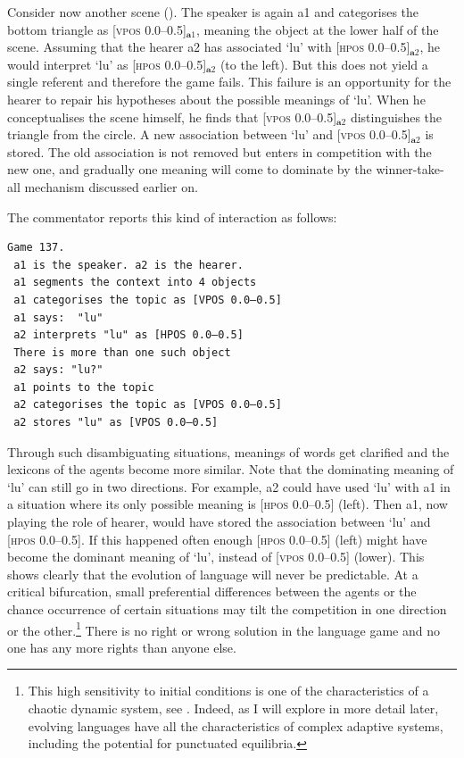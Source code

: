 Consider now another scene (). The speaker
is again {\bfshape a1} and categorises the bottom triangle as 
[\textsc{vpos} 0.0–0.5]$_{\mathbf  a1}$, meaning
the object at the lower half of the scene. Assuming that the
hearer {\bfshape a2} has associated `lu' with [\textsc{hpos} 0.0–0.5]$_{\mathbf  a2}$, he
would interpret `lu' as [\textsc{hpos} 0.0–0.5]$_{\mathbf  a2}$ (to the left). But this 
does not yield a single 
referent and therefore the game fails. 
This failure is an opportunity for the hearer to repair his 
hypotheses about the possible meanings of `lu'.
When he conceptualises the scene himself, 
he finds that [\textsc{vpos} 0.0–0.5]$_{\mathbf  a2}$ distinguishes the triangle
from the circle. A new association between 
`lu' and [\textsc{vpos} 0.0–0.5]$_{\mathbf  a2}$ is stored. The old association
is not removed but enters in competition with the new
one, and gradually one meaning will come to dominate
by the winner-take-all mechanism discussed earlier on. 

The commentator reports this kind of interaction as follows: 
\begin{verbatim}
Game 137.
 a1 is the speaker. a2 is the hearer. 
 a1 segments the context into 4 objects
 a1 categorises the topic as [VPOS 0.0–0.5]
 a1 says:  "lu"
 a2 interprets "lu" as [HPOS 0.0–0.5]
 There is more than one such object
 a2 says: "lu?"
 a1 points to the topic
 a2 categorises the topic as [VPOS 0.0–0.5]
 a2 stores "lu" as [VPOS 0.0–0.5]
\end{verbatim}

Through such disambiguating situations, meanings of words
get clarified and the lexicons of the agents
become more similar. Note that the 
dominating meaning of `lu' can still go in 
two directions. For example, {\bfshape a2}
could have used `lu' with {\bfshape a1} 
in a situation where its only possible meaning 
is [\textsc{hpos} 0.0–0.5] (left). Then {\bfshape a1}, now playing the role
of hearer, would have stored the association between
`lu' and [\textsc{hpos} 0.0–0.5]. If this happened often 
enough [\textsc{hpos} 0.0–0.5] (left) might
have become the dominant meaning of `lu', instead of 
[\textsc{vpos} 0.0–0.5] (lower). This shows clearly that the 
evolution of language will never be predictable. At a critical 
bifurcation, small preferential differences between 
the agents or the chance occurrence of certain situations
may tilt the competition in one direction or the other.\footnote{
This high sensitivity to initial conditions is 
one of the characteristics of a chaotic dynamic
system, see \cite{Lorenz:1993}.
Indeed, as I will explore in more detail later, 
evolving languages have all the characteristics
of complex adaptive systems, including the 
potential for punctuated equilibria.}
There is no right
or wrong solution in the language game and no one has
any more rights than anyone else. 

